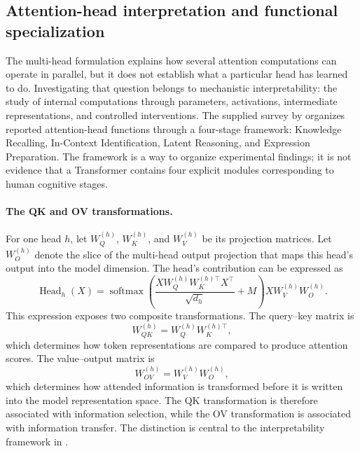 \subsection{Attention-head interpretation and functional specialization}
\label{subsec:attn-head-interpretability}

The multi-head formulation explains how several attention computations
can operate in parallel, but it does not establish what a particular head
has learned to do. Investigating that question belongs to mechanistic
interpretability: the study of internal computations through parameters,
activations, intermediate representations, and controlled interventions.
The supplied survey by \textcite{zheng2024attentionheads} organizes
reported attention-head functions through a four-stage framework:
Knowledge Recalling, In-Context Identification, Latent Reasoning, and
Expression Preparation. The framework is a way to organize experimental
findings; it is not evidence that a Transformer contains four explicit
modules corresponding to human cognitive stages.

\paragraph{The QK and OV transformations.}
For one head \(h\), let \(W_Q^{(h)}\), \(W_K^{(h)}\), and \(W_V^{(h)}\)
be its projection matrices. Let \(W_O^{(h)}\) denote the slice of the
multi-head output projection that maps this head's output into the model
dimension. The head's contribution can be expressed as
\begin{equation}
    \operatorname{Head}_h(X)
    =
    \operatorname{softmax}
    \left(
        \frac{
            XW_Q^{(h)}W_K^{(h)\top}X^\top
        }{\sqrt{d_h}}+M
    \right)
    XW_V^{(h)}W_O^{(h)}.
    \label{eq:attn-head-expanded}
\end{equation}
This expression exposes two composite transformations. The query--key
matrix is
\begin{equation}
    W_{QK}^{(h)}
    =
    W_Q^{(h)}W_K^{(h)\top},
    \label{eq:attn-qk-matrix}
\end{equation}
which determines how token representations are compared to produce
attention scores. The value--output matrix is
\begin{equation}
    W_{OV}^{(h)}
    =
    W_V^{(h)}W_O^{(h)},
    \label{eq:attn-ov-matrix}
\end{equation}
which determines how attended information is transformed before it is
written into the model representation space. The QK transformation is
therefore associated with information selection, while the OV
transformation is associated with information transfer. The distinction
is central to the interpretability framework in
\textcite{zheng2024attentionheads}.

